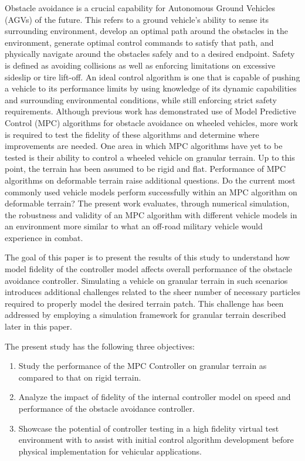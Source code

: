 \documentclass[12pt,onecolumn]{article}
\newcommand{\CHRONO}{{\sffamily{{Chrono}}}}
\begin{document}
Obstacle avoidance is a crucial capability for Autonomous Ground Vehicles (AGVs) of the future. This refers to a ground vehicle's ability to sense its surrounding environment, develop an optimal path around the obstacles in the environment, generate optimal control commands to satisfy that path, and physically navigate around the obstacles safely and to a desired endpoint. Safety is defined as avoiding collisions as well as enforcing limitations on excessive sideslip or tire lift-off. An ideal control algorithm is one that is capable of pushing a vehicle to its performance limits by using knowledge of its dynamic capabilities and surrounding environmental conditions, while still enforcing strict safety requirements. Although previous work has demonstrated use of Model Predictive Control (MPC) algorithms for obstacle avoidance on wheeled vehicles, more work is required to test the fidelity of these algorithms and determine where improvements are needed. One area in which MPC algorithms have yet to be tested is their ability to control a wheeled vehicle on granular terrain. Up to this point, the terrain has been assumed to be rigid and flat. Performance of MPC algorithms on deformable terrain raise additional questions. Do the current most commonly used vehicle models perform successfully within an MPC algorithm on deformable terrain? The present work evaluates, through numerical simulation, the robustness and validity of an MPC algorithm with different vehicle models in an environment more similar to what an off-road military vehicle would experience in combat.

The goal of this paper is to present the results of this study to understand how model fidelity of the controller model affects overall performance of the obstacle avoidance controller. Simulating a vehicle on granular terrain in such scenarios introduces additional challenges related to the sheer number of necessary particles required to properly model the desired terrain patch. This challenge has been addressed by employing a simulation framework for granular terrain described later in this paper.

The present study has the following three objectives:
\begin{enumerate}
\item
Study the performance of the MPC Controller on granular terrain as compared to that on rigid terrain.
\item
Analyze the impact of fidelity of the internal controller model on speed and performance of the obstacle avoidance controller.
\item
Showcase the potential of controller testing in a high fidelity virtual test environment with {\CHRONO} to assist with initial control algorithm development before physical implementation for vehicular applications.
\end{enumerate}
\end{document}
